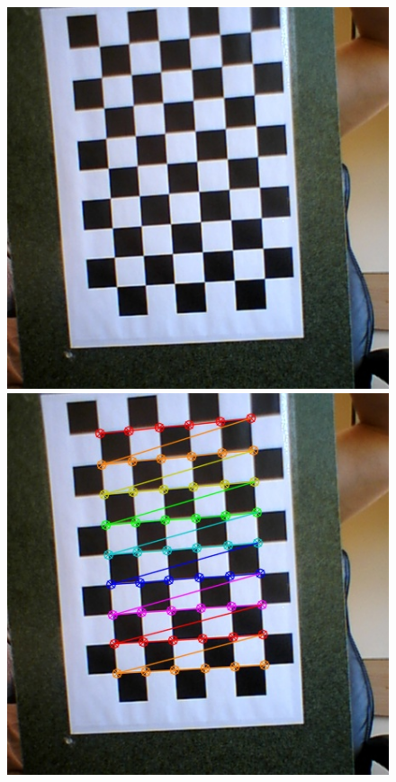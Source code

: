 \documentclass{article}
\begin{document}
\begin{figure}[!hb]
    \begin{minipage}[b]{0.49\textwidth}
    	   \centering
		\includegraphics[width=\textwidth]{IMG/Cal_01.jpg}
	\end{minipage}
    \hfill
    \begin{minipage}[b]{0.49\textwidth}
	    \centering
		\includegraphics[width=\textwidth]{IMG/Cal_02.jpg}
	\end{minipage}
\end{figure}
\end{document}
